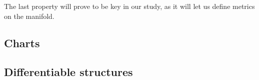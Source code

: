 
The last property will prove to be key in our study, as it will let us define metrics on the manifold.

\subsection{Charts}

\begin{definition}
\end{definition}

\begin{definition}
\end{definition}


\subsection{Differentiable structures}

\begin{definition}
\end{definition}

\begin{definition}
\end{definition}

\begin{definition}
\end{definition}

\begin{proposition}
\end{proposition}

\begin{definition}
\end{definition}

\begin{definition}
\end{definition}
